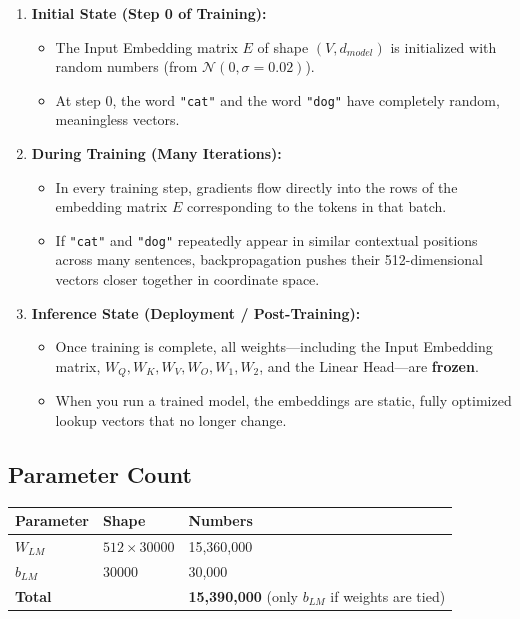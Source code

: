 \documentclass[11pt,a4paper,oneside]{report}
\providecommand{\tightlist}{\setlength{\itemsep}{0pt}\setlength{\parskip}{0pt}}
\begin{document}
\begin{enumerate}
\def\labelenumi{\arabic{enumi}.}
\item
  \textbf{Initial State (Step 0 of Training):}

  \begin{itemize}
  \tightlist
  \item
    The Input Embedding matrix \(E\) of shape \((V, d_{model})\) is initialized with random numbers (from \(\mathcal{N}(0, \sigma = 0.02)\)).
  \item
    At step 0, the word \texttt{"cat"} and the word \texttt{"dog"} have completely random, meaningless vectors.
  \end{itemize}
\item
  \textbf{During Training (Many Iterations):}

  \begin{itemize}
  \tightlist
  \item
    In every training step, gradients flow directly into the rows of the embedding matrix \(E\) corresponding to the tokens in that batch.
  \item
    If \texttt{"cat"} and \texttt{"dog"} repeatedly appear in similar contextual positions across many sentences, backpropagation pushes their 512-dimensional vectors closer together in coordinate space.
  \end{itemize}
\item
  \textbf{Inference State (Deployment / Post-Training):}

  \begin{itemize}
  \tightlist
  \item
    Once training is complete, all weights---including the Input Embedding matrix, \(W_Q, W_K, W_V, W_O, W_1, W_2\), and the Linear Head---are \textbf{frozen}.
  \item
    When you run a trained model, the embeddings are static, fully optimized lookup vectors that no longer change.
  \end{itemize}
\end{enumerate}

\subsection{Parameter Count}\label{parameter-count}

{\def\LTcaptype{none} %
\begin{longtable}[]{@{}lll@{}}
\toprule\noalign{}
Parameter & Shape & Numbers \\
\midrule\noalign{}
\endhead
\bottomrule\noalign{}
\endlastfoot
\(W_{LM}\) & \(512 \times 30000\) & 15,360,000 \\
\(b_{LM}\) & \(30000\) & 30,000 \\
\textbf{Total} & & \textbf{15,390,000} (only \(b_{LM}\) if weights are tied) \\
\end{longtable}
}
\end{document}
